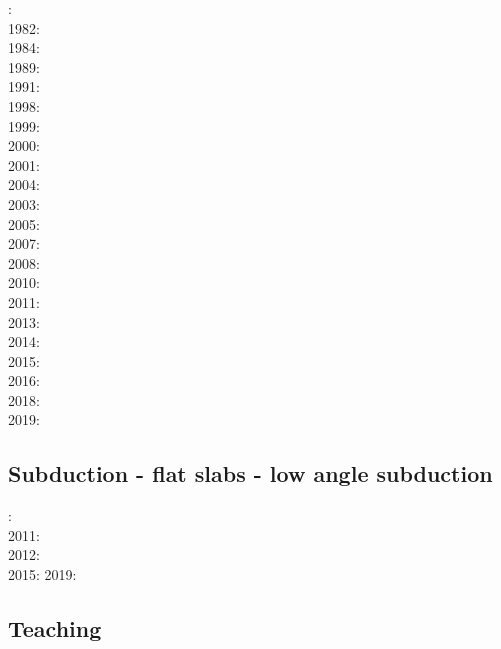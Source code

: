 : \cite{bird78}\\
1982: \cite{clwv82}\\
1984: \cite{cade84}\\
1989: \cite{clwv89}\\
1991: \cite{muph91}\\
1998: \cite{togu98}\\
1999: \cite{fagd99}\\
2000: \cite{pybf00}\\
2001: \cite{dohe01}\cite{reyb01}\cite{brry01}\\
2004: \cite{ster04}\cite{guhl04}\\
2003: \cite{hags03}\\
2005: \cite{bihi05}\\
2007: \cite{kore07}\\
2008: \cite{uegs08}\\
2010: \cite{nigm10}\cite{bucl10}\\
2011: \cite{bagw11}\cite{nigm11}\\
2013: \cite{dyge13}\cite{mana13}\cite{kore13}\\
2014: \cite{recf14}\cite{macg14}\\
2015: \cite{matv15}\cite{pebu15}\cite{vapm15}\\
2016: \cite{crta16}\\
2018: \cite{zhlg18}\cite{basq18}\\
2019: \cite{begb19}\cite{gubg19}\cite{ulcw19}

\subsection*{Subduction - flat slabs - low angle subduction}

: \cite{vavv02}\\
2011: \cite{cube11}\\
2012: \cite{mapm12}\\
2015: \cite{gehm15}\cite{tarn15}
2019: \cite{sifg19}\cite{sams19b}

\subsection*{Teaching} 

